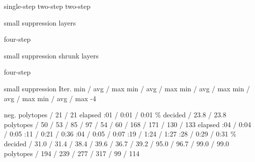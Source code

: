     \setupTABLE[frame=off,rightframe=on]
    \setupTABLE[c][first][rightframe=off]
    \setupTABLE[r][last][bottomframe=on]
    \bTABLE[align={middle,lohi}]
        \bTR[topframe=off]
            \bTH[width=0.06\textheight] \eTH
            \bTH[width=0.09\textheight] \eTH
            \bTH[width=0.17\textheight] single-step  \eTH
            \bTH[width=0.17\textheight] two-step \eTH
            \bTH[width=0.17\textheight] two-step \par small suppression \eTH
            \bTH[width=0.17\textheight] layers \par four-step \par small suppression \eTH
            \bTH[width=0.17\textheight] shrunk layers \par four-step \par small suppression \eTH
        \eTR
        \bTR[topframe=off]
            \bTH Iter. \eTH
            \bTH \eTH
            \bTD min / avg / max \eTD
            \bTD min / avg / max \eTD
            \bTD min / avg / max \eTD
            \bTD min / avg / max \eTD
            \bTD min / avg / max \eTD
        \eTR
        \bTR[topframe=on]
            -4 \par neg. \eTH
            \bTD polytopes \eTD
             / 21 / 21 \eTD
        \eTR
        \bTR
            \bTD elapsed \eTD
            :01 / 0:01 / 0:01 \eTD
        \eTR
        \bTR
            \bTD \% decided \eTD
             / 23.8 / 23.8 \eTD
        \eTR
        \bTR[topframe=on]
             \eTH
            \bTD polytopes \eTD
             / 50 / 53 \eTD
             / 85 / 97 \eTD
             / 54 / 60 \eTD
             / 168 / 171 \eTD
             / 130 / 133 \eTD
        \eTR
        \bTR
            \bTD elapsed \eTD
            :04 / 0:04 / 0:05 \eTD
            :11 / 0:21 / 0:36 \eTD
            :04 / 0:05 / 0:07 \eTD
            :19 / 1:24 / 1:27 \eTD
            :28 / 0:29 / 0:31 \eTD
        \eTR
        \bTR
            \bTD \% decided \eTD
             / 31.0 / 31.4 \eTD
             / 38.4 / 39.6 \eTD
             / 36.7 / 39.2 \eTD
             / 95.0 / 96.7 \eTD
             / 99.0 / 99.0 \eTD
        \eTR
        \bTR[topframe=on]
             \eTH
            \bTD polytopes \eTD
             / 194 / 239 \eTD
             / 277 / 317 \eTD
             / 99 / 114 \eTD
